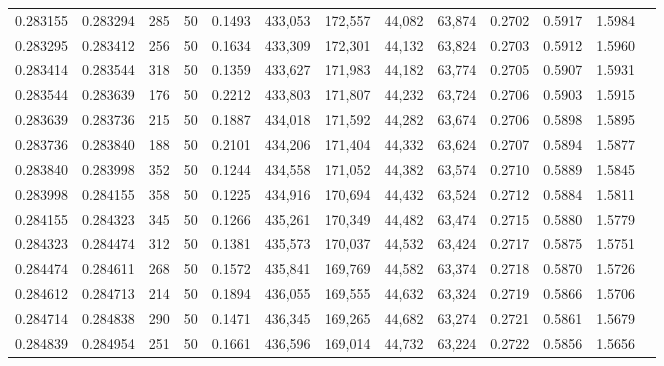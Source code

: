 \begin{tabular}{rrrrrrrrrrrrr}
0.283155 & 0.283294 &   285 &  50 &                                     0.1493 & 433,053 & 172,557 &  44,082 &  63,874 & 0.2702 & 0.5917 & 1.5984 \\
0.283295 & 0.283412 &   256 &  50 &                                     0.1634 & 433,309 & 172,301 &  44,132 &  63,824 & 0.2703 & 0.5912 & 1.5960 \\
0.283414 & 0.283544 &   318 &  50 &                                     0.1359 & 433,627 & 171,983 &  44,182 &  63,774 & 0.2705 & 0.5907 & 1.5931 \\
0.283544 & 0.283639 &   176 &  50 &                                     0.2212 & 433,803 & 171,807 &  44,232 &  63,724 & 0.2706 & 0.5903 & 1.5915 \\
0.283639 & 0.283736 &   215 &  50 &                                     0.1887 & 434,018 & 171,592 &  44,282 &  63,674 & 0.2706 & 0.5898 & 1.5895 \\
0.283736 & 0.283840 &   188 &  50 &                                     0.2101 & 434,206 & 171,404 &  44,332 &  63,624 & 0.2707 & 0.5894 & 1.5877 \\
0.283840 & 0.283998 &   352 &  50 &                                     0.1244 & 434,558 & 171,052 &  44,382 &  63,574 & 0.2710 & 0.5889 & 1.5845 \\
0.283998 & 0.284155 &   358 &  50 &                                     0.1225 & 434,916 & 170,694 &  44,432 &  63,524 & 0.2712 & 0.5884 & 1.5811 \\
0.284155 & 0.284323 &   345 &  50 &                                     0.1266 & 435,261 & 170,349 &  44,482 &  63,474 & 0.2715 & 0.5880 & 1.5779 \\
0.284323 & 0.284474 &   312 &  50 &                                     0.1381 & 435,573 & 170,037 &  44,532 &  63,424 & 0.2717 & 0.5875 & 1.5751 \\
0.284474 & 0.284611 &   268 &  50 &                                     0.1572 & 435,841 & 169,769 &  44,582 &  63,374 & 0.2718 & 0.5870 & 1.5726 \\
0.284612 & 0.284713 &   214 &  50 &                                     0.1894 & 436,055 & 169,555 &  44,632 &  63,324 & 0.2719 & 0.5866 & 1.5706 \\
0.284714 & 0.284838 &   290 &  50 &                                     0.1471 & 436,345 & 169,265 &  44,682 &  63,274 & 0.2721 & 0.5861 & 1.5679 \\
0.284839 & 0.284954 &   251 &  50 &                                     0.1661 & 436,596 & 169,014 &  44,732 &  63,224 & 0.2722 & 0.5856 & 1.5656 \\

\end{tabular}
